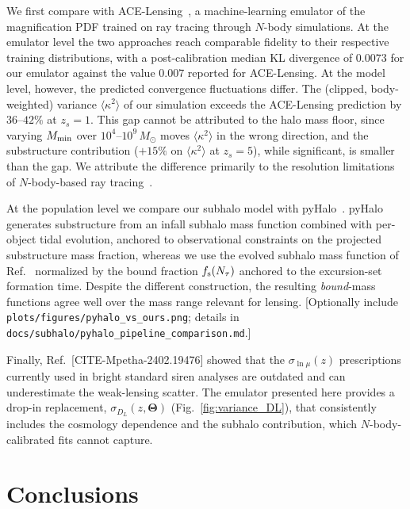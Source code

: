 \documentclass[aps,prd,10pt,nofootinbib,twocolumn,superscriptaddress,floatfix,notitlepage]{revtex4-1}
\newcommand{\Msun}{M_\odot}
\newcommand{\vect}[1]{\boldsymbol{#1}}
\newcommand{\B}[1]{{\color{blue} #1}}
\begin{document}
\B{We first compare with ACE-Lensing~\cite{Turker:2025rdt}, a machine-learning
emulator of the magnification PDF trained on ray tracing through $N$-body
simulations. At the emulator level the two approaches reach comparable fidelity
to their respective training distributions, with a post-calibration median KL
divergence of $0.0073$ for our emulator against the value $0.007$ reported for
ACE-Lensing. At the model level, however, the predicted convergence fluctuations
differ. The (clipped, body-weighted) variance $\langle\kappa^2\rangle$ of our
simulation exceeds the ACE-Lensing prediction by $36$--$42\%$ at $z_s = 1$. This gap cannot
be attributed to the halo mass floor, since varying $M_{\rm min}$ over
$10^4$--$10^9\,\Msun$ moves $\langle\kappa^2\rangle$ in the wrong direction,
and the substructure contribution ($+15\%$ on $\langle\kappa^2\rangle$ at
$z_s = 5$), while significant, is smaller than the gap. We attribute the
difference primarily to the resolution limitations of $N$-body-based ray
tracing~\cite{DES:2025omh}.}

\B{At the population level we compare our subhalo model with
pyHalo~\cite{Gilman:2021sdr}. pyHalo generates substructure from an infall subhalo mass
function combined with per-object tidal evolution, anchored to observational
constraints on the projected substructure mass fraction, whereas we use the
evolved subhalo mass function of Ref.~\cite{Jiang:2014nsa} normalized by the
bound fraction $f_{\rm s}(N_\tau)$ anchored to the excursion-set formation
time. Despite the different construction, the resulting \emph{bound}-mass
functions agree well over the mass range relevant for lensing.
[Optionally include \texttt{plots/figures/pyhalo\_vs\_ours.png}; details in
\texttt{docs/subhalo/pyhalo\_pipeline\_comparison.md}.]}

\B{Finally, Ref.~[CITE-Mpetha-2402.19476] showed that the
$\sigma_{\ln\mu}(z)$ prescriptions currently used in bright standard siren
analyses are outdated and can underestimate the weak-lensing scatter. The
emulator presented here provides a drop-in replacement, $\sigma_{D_L}(z,
\vect\Theta)$ (Fig.~\ref{fig:variance_DL}), that consistently includes the
cosmology dependence and the subhalo contribution, which $N$-body-calibrated
fits cannot capture.}

\section{Conclusions}
\label{sec:conclusions}
\end{document}
